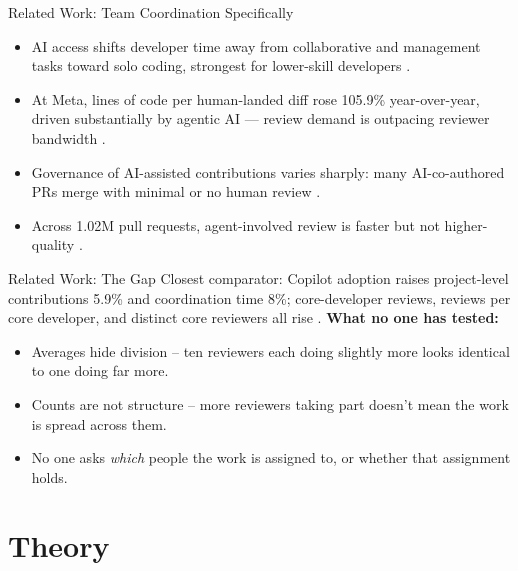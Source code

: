 \begin{frame}{Related Work: Team Coordination Specifically}
\begin{itemize}
  \item AI access shifts developer time away from collaborative and
        management tasks toward solo coding, strongest for lower-skill
        developers \cite{hoffmann2025generative}.
  \item At Meta, lines of code per human-landed diff rose 105.9\%
        year-over-year, driven substantially by agentic AI --- review
        demand is outpacing reviewer bandwidth \cite{adams2026radar}.
  \item Governance of AI-assisted contributions varies sharply: many
        AI-co-authored PRs merge with minimal or no human review
        \cite{gao2026autopilot}.
  \item Across 1.02M pull requests, agent-involved review is faster but
        not higher-quality \cite{zhong2026generations}.
\end{itemize}
\end{frame}

\begin{frame}{Related Work: The Gap}
Closest comparator: Copilot adoption raises project-level contributions
5.9\% and coordination time 8\%; core-developer reviews, reviews per
core developer, and distinct core reviewers all rise
\cite{song2026impact}.
\vspace{0.3em}
\textbf{What no one has tested:}
\begin{itemize}
  \item Averages hide division -- ten reviewers each doing slightly more
        looks identical to one doing far more.
  \item Counts are not structure -- more reviewers taking part doesn't
        mean the work is spread across them.
  \item No one asks \emph{which} people the work is assigned to, or
        whether that assignment holds.
\end{itemize}
\end{frame}

\section{Theory}

